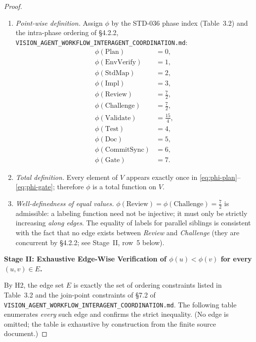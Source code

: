 \documentclass[12pt]{article}
\theoremstyle{definition}
\newcommand{\code}[1]{\texttt{#1}}
\newcommand{\VisionFlow}{\code{VISION\_AGENT\_\allowbreak WORKFLOW\_\allowbreak INTERAGENT\_\allowbreak COORDINATION.md}}
\begin{document}
\begin{proof}
\begin{enumerate}
  \item \emph{Point-wise definition.} Assign $\phi$ by the STD-036 phase
        index (Table~3.2) and the intra-phase ordering of
        \S4.2.2,
        \VisionFlow{}:
        \begin{align}
          \phi(\mathrm{Plan})        &= 0,   \label{eq:phi-plan}\\
          \phi(\mathrm{EnvVerify})   &= 1,   \label{eq:phi-env}\\
          \phi(\mathrm{StdMap})      &= 2,   \label{eq:phi-std}\\
          \phi(\mathrm{Impl})        &= 3,   \label{eq:phi-impl}\\
          \phi(\mathrm{Review})      &= \tfrac{7}{2}, \label{eq:phi-rev}\\
          \phi(\mathrm{Challenge})   &= \tfrac{7}{2}, \label{eq:phi-chal}\\
          \phi(\mathrm{Validate})    &= \tfrac{15}{4},\label{eq:phi-val}\\
          \phi(\mathrm{Test})        &= 4,   \label{eq:phi-test}\\
          \phi(\mathrm{Doc})         &= 5,   \label{eq:phi-doc}\\
          \phi(\mathrm{CommitSync})  &= 6,   \label{eq:phi-cs}\\
          \phi(\mathrm{Gate})        &= 7.   \label{eq:phi-gate}
        \end{align}

  \item \emph{Total definition.} Every element of $V$ appears exactly once
        in \eqref{eq:phi-plan}--\eqref{eq:phi-gate}; therefore $\phi$ is
        a total function on $V$.

  \item \emph{Well-definedness of equal values.}
        $\phi(\mathrm{Review}) = \phi(\mathrm{Challenge}) = \tfrac{7}{2}$
        is admissible: a labeling function need not be injective; it must
        only be strictly increasing \emph{along edges}.  The equality of
        labels for parallel siblings is consistent with the fact that no
        edge exists between \textit{Review} and \textit{Challenge} (they
        are concurrent by \S4.2.2; see Stage~II, row~5 below).
\end{enumerate}

\medskip
\noindent\textbf{Stage II: Exhaustive Edge-Wise Verification of
$\phi(u) < \phi(v)$ for every $(u,v)\in E$.}

\begin{sloppypar}
By H2, the edge set $E$ is exactly the set of ordering constraints listed in
Table~3.2 and the join-point constraints of \S7.2 of
\VisionFlow{}.
The following table enumerates \emph{every} such edge and confirms the
strict inequality.  (No edge is omitted; the table is exhaustive by
construction from the finite source document.)
\end{sloppypar}


\end{proof}
\end{document}
